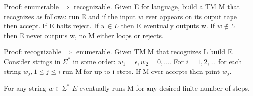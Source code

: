 Proof: enumerable $\Rightarrow$ recognizable. Given E for language, build a TM M that recognizes as follows: run E and if the input $w$ ever appears on its ouput tape then accept. If E halts reject. If $w\in L$ then E eventually outputs w. If $w\notin L$ then E never outputs w, no M either loops or rejects.

Proof: recognizable $\Rightarrow$ enumerable. Given TM M that recognizes L build E. Consider strings in $\Sigma^*$ in some order: $w_1=\epsilon,w_2=0,\dotsc$. For $i=1,2,\dotsc$ for each string $w_j,1\leq j\leq i$ run M for up to i steps. If M ever accepts then print $w_j$.

For any string $w\in \Sigma^*$ $E$ eventually runs M for any desired finite number of steps.



